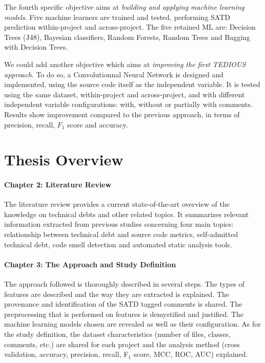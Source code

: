 The fourth specific objective aims at \emph{building and applying machine learning models}. Five machine learners are trained and tested, performing \ac{SATD} prediction within-project and across-project. The five retained ML are: Decision Trees (J48), Bayesian classifiers, Random Forests, Random Trees and Bagging with Decision Trees. \par

We could add another objective which aims at \emph{improving the first \ac{TEDIOUS} approach}. To do so, a Convolutionnal Neural Network is designed and implemented, using the source code itself as the independent variable. It is tested using the same dataset, within-project and across-project, and with different independent variable configurations: with, without or partially with comments. Results show improvement compared to the previous approach, in terms of precision, recall, $F_1$ score and accuracy.

\section{Thesis Overview}  


\paragraph{Chapter 2: Literature Review}
The literature review provides a current state-of-the-art overview of the knowledge on technical debts and other related topics. It summarizes relevant information extracted from previous studies concerning four main topics: relationship between technical debt and source code metrics, self-admitted technical debt, code smell detection and automated static analysis tools.

\paragraph{Chapter 3: The Approach and Study Definition}
The approach followed is thoroughly described in several steps. The types of features are described and the way they are extracted is explained. The provenance and identification of the \ac{SATD} tagged comments is shared. The preprocessing that is performed on features is demystified and justified. The machine learning models chosen are revealed as well as their configuration. As for the study definition, the dataset characteristics (number of files, classes, comments, etc.) are shared for each project and the analysis method (cross validation, accuracy, precision, recall, F$_{1}$ score, \ac{MCC}, \ac{ROC}, \ac{AUC}) explained.

